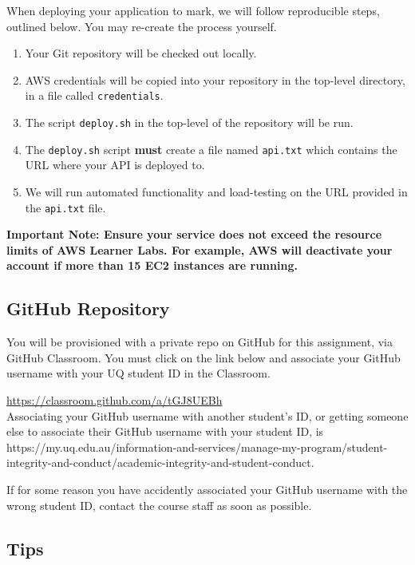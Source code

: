 \documentclass{csse4400}
\begin{document}
When deploying your application to mark,
we will follow reproducible steps, outlined below.
You may re-create the process yourself.

\begin{enumerate}
  \item Your Git repository will be checked out locally.
  \item AWS credentials will be copied into your repository in the top-level directory,
  in a file called \texttt{credentials}.
  \item The script \texttt{deploy.sh} in the top-level of the repository will be run.
  \item The \texttt{deploy.sh} script \textbf{must} create a file named \texttt{api.txt} which contains the URL where your API is deployed to.
  \item We will run automated functionality and load-testing on the URL provided in the \texttt{api.txt} file.
\end{enumerate}

\textbf{Important Note: 
Ensure your service does not exceed the resource limits of AWS Learner Labs.
For example, AWS will deactivate your account if more than 15 EC2 instances are running.}

\subsection{GitHub Repository}\label{sec:github}
You will be provisioned with a private repo on GitHub for this assignment, via GitHub Classroom.
You must click on the link below and associate your GitHub username with your UQ student ID in the Classroom.

\url{https://classroom.github.com/a/tGJ8UEBh}\\
Associating your GitHub username with another student's ID,
or getting someone else to associate their GitHub username with your student ID, is 
{https://my.uq.edu.au/information-and-services/manage-my-program/student-integrity-and-conduct/academic-integrity-and-student-conduct}.

If for some reason you have accidently associated your GitHub username with the wrong student ID,
contact the course staff as soon as possible.

\subsection{Tips}

\end{document}
